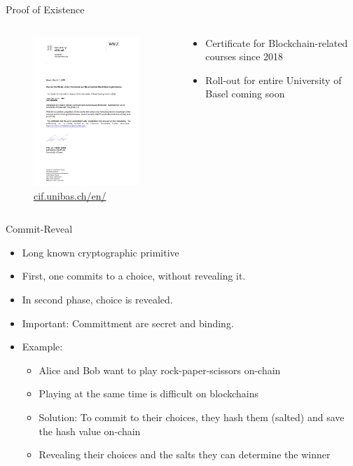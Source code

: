 \documentclass[handout]{beamer}
\begin{document}

\begin{frame}{Proof of Existence}
	\begin{columns}
		\begin{column}{0.4\textwidth}
			\begin{figure}
				\centering
				\includegraphics[width=4cm, frame]{../assets/images/Diploma_unibas.PNG}
				\scriptsize{\href{https://cif.unibas.ch/en/events-projects/certificates/}{cif.unibas.ch/en/}}
			\end{figure}
		\end{column}
		\begin{column}{0.6\textwidth}
			\begin{itemize}
				\item<2 -> Certificate for Blockchain-related courses since 2018 
				\item<3 -> Roll-out for entire University of Basel coming soon
			\end{itemize}
		\end{column}
	\end{columns}
\end{frame}


\begin{frame}{Commit-Reveal}
	\begin{itemize}
		\item<1 -> Long known cryptographic primitive
		\item<2 -> First, one commits to a choice, without revealing it.
		\item<3 -> In second phase, choice is revealed.
		\item<4 -> Important: Committment are secret and binding.\vspace{0.5cm}
		\item<5 -> Example:
		\begin{itemize}
			\item<5 -> Alice and Bob want to play rock-paper-scissors on-chain
			\item<6 -> Playing at the same time is difficult on blockchains
			\item<7 -> Solution: To commit to their choices, they hash them (salted) and save the hash value on-chain
			\item<8 -> Revealing their choices and the salts they can determine the winner
		\end{itemize}
	\end{itemize}
\end{frame}
\end{document}
